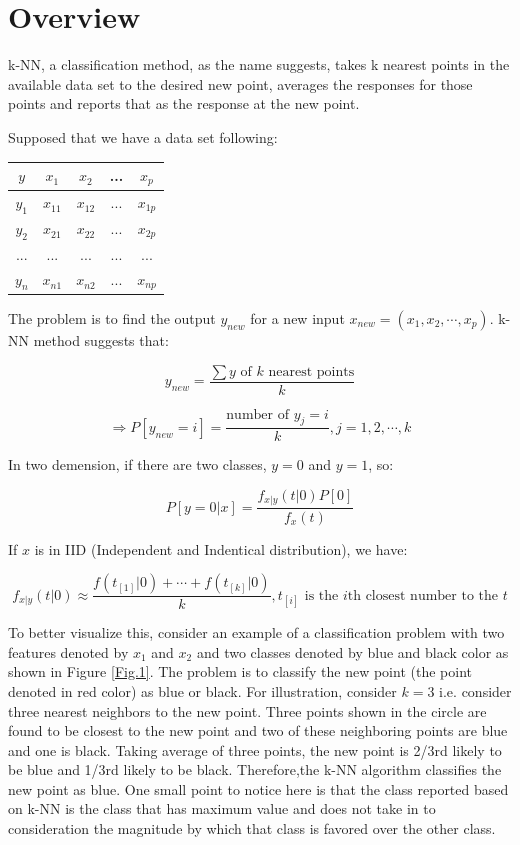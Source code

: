 \documentclass{article}
\begin{document}
\clearpage 

\section{Overview}
k-NN, a classification method, as the name suggests, takes k nearest points in the available data set to the desired new point, averages the responses for those points and reports that as the response at the new point. 

Supposed that we have a data set following:

\begin{center}{
    \begin{tabular}{c|c c c c }

        $y$ & $x_1$ & $x_2$ & ... & $x_p$ \\
        \hline
        $y_1$ & $x_{11}$ & $x_{12}$ & ... & $x_{1p}$ \\
        
        $y_2$ & $x_{21}$ & $x_{22}$ & ... & $x_{2p}$ \\
        
        ... & ... & ... & ... & ... \\
        
        $y_n$ & $x_{n1}$ & $x_{n2}$ & ... & $x_{np}$ \\
        
    \end{tabular}
}
\end{center}

The problem is to find the output $y_{new}$ for a new input \(x_{new}=(x_1,x_2, \cdots,x_p)\). k-NN method suggests that:

\[y_{new}=\frac{\sum y \text{ of } k \text{ nearest points}}{k}\]

\[\Rightarrow P[y_{new}=i]=\frac{\text{number of } y_j=i}{k}, j=1,2,\cdots,k\]

In two demension, if there are two classes, \(y=0\) and \(y=1\), so:

\[P[y=0|x]=\frac{f_{x|y}(t|0)P[0]}{f_x(t)}\]

If $x$ is in IID (Independent and Indentical distribution), we have:

\[f_{x|y}(t|0)\approx \frac{f(t_{[1]}|0)+\cdots+f(t_{[k]}|0)}{k}, t_{[i]} \text{ is the $i$th closest number to the $t$}\]

To better visualize this, consider an example of a classification problem with two features denoted by $x_1$ and $x_2$ and two classes denoted by blue and black color as shown in Figure \ref{Fig.1}. The problem is to classify the new point (the point denoted in red color) as blue or black. For illustration, consider $k = 3$ i.e. consider three nearest neighbors to the new point. Three points shown in the circle are found to be closest to the new point and two of these neighboring points are blue and one is black. Taking average of three points, the new point is 2/3rd likely to be blue and 1/3rd likely to be black. Therefore,the k-NN algorithm classifies the new point as blue. One small point to notice here is that the class reported based on k-NN is the class that has maximum value and does not take in to consideration the magnitude by which that class is favored over the other class.
\end{document}
